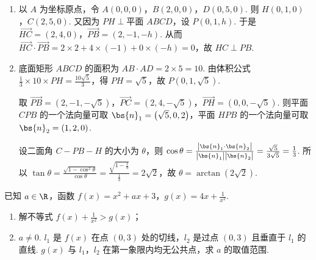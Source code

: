 \begin{solution}
\begin{enumerate}
\item 以 \(A\) 为坐标原点，令
\( A\left( 0,0,0 \right) \)，\( B\left( 2,0,0 \right) \)，\( D\left( 0,5,0 \right) \). 则
\( H\left( 0,1,0 \right) \)，\( C\left( 2,5,0 \right) \). 又因为 \( PH\perp\text{平面 }ABCD \)，设 \( P\left( 0,1,h \right) \).
于是 \( \overrightarrow{HC}=\left( 2,4,0 \right) \)，\( \overrightarrow{PB}=\left( 2,-1,-h \right) \). 从而 \( \overrightarrow{HC}\cdot \overrightarrow{PB}=2\times 2+4\times \left( -1 \right)+0\times \left( -h \right)=0 \)，故 \( HC\perp PB \).

\item 底面矩形 \(ABCD\) 的面积为 \( AB\cdot AD=2\times 5=10 \). 由体积公式 \( \frac{1}{3}\times 10\times PH=\frac{10\sqrt{5}}{3} \)，得 \( PH=\sqrt{5} \)，故 \( P\left( 0,1,\sqrt{5} \right) \).

取 \( \overrightarrow{PB}=\left( 2,-1,-\sqrt{5} \right) \)，\( \overrightarrow{PC}=\left( 2,4,-\sqrt{5} \right) \)，\( \overrightarrow{PH}=\left( 0,0,-\sqrt{5} \right) \). 则平面 \(CPB\) 的一个法向量可取 \( \bs{n}_1=\left( \sqrt{5},0,2 \right) \)，平面 \(HPB\) 的一个法向量可取 \( \bs{n}_2=\left( 1,2,0 \right) \).

设二面角 \( C-PB-H \) 的大小为 \( \theta \)，则 \( \cos \theta=\frac{\left| \bs{n}_1\cdot \bs{n}_2 \right|}{\left| \bs{n}_1 \right|\left| \bs{n}_2 \right|}=\frac{\sqrt{5}}{3\sqrt{5}}=\frac{1}{3} \). 所以 \( \tan \theta=\frac{\sqrt{1-\cos^2\theta}}{\cos \theta}=\frac{\sqrt{1-\frac{1}{9}}}{\frac{1}{3}}=2\sqrt{2} \)，故 \( \theta=\arctan\left( 2\sqrt{2} \right) \).
\end{enumerate}
\end{solution}

\begin{problem}
已知 \( a\in \R \)，函数 \( f(x)=x^2+ax+3 \)，\( g(x)=4x+\frac{1}{x^2} \).

\begin{enumerate}
\item 解不等式 \( f(x)+\frac{1}{x^2}>g(x) \)；
\item \( a\neq 0 \). \( l_1 \) 是 \( f(x) \) 在点 \( \left( 0,3 \right) \) 处的切线，\( l_2 \) 是过点 \( \left( 0,3 \right) \) 且垂直于 \( l_1 \) 的直线. \( g(x) \) 与 \( l_1 \)，\( l_2 \) 在第一象限内均无公共点，求 \( a \) 的取值范围.
\end{enumerate}
\end{problem}


